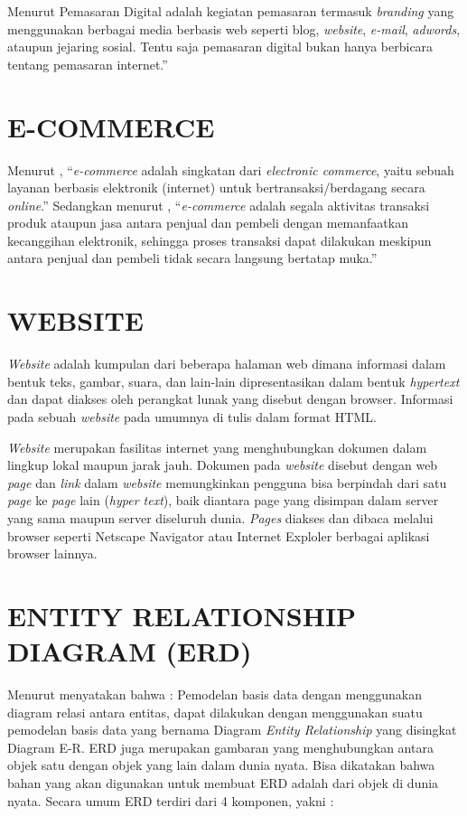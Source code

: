 \par Menurut \cite{tarigan2013creative} Pemasaran Digital adalah kegiatan pemasaran termasuk \textit{branding} yang menggunakan berbagai media berbasis web seperti blog, \textit{website}, \textit{e-mail}, \textit{adwords}, ataupun jejaring sosial. Tentu saja pemasaran digital bukan hanya berbicara tentang pemasaran internet.”

\section{\uppercase{E-commerce}}
Menurut \cite{yuhefizar2013} , “\textit{e-commerce} adalah singkatan dari \textit{electronic commerce}, yaitu sebuah layanan berbasis elektronik (internet) untuk bertransaksi/berdagang secara \textit{online}.” Sedangkan menurut \cite{saputra2013}, “\textit{e-commerce} adalah segala aktivitas transaksi produk ataupun jasa antara penjual dan pembeli dengan memanfaatkan kecanggihan elektronik, sehingga proses transaksi dapat dilakukan meskipun antara penjual dan pembeli tidak secara langsung bertatap muka.”

\section{\uppercase{Website}}
\textit{Website} adalah kumpulan dari beberapa halaman web dimana informasi dalam bentuk teks, gambar, suara, dan lain-lain dipresentasikan dalam bentuk \textit{hypertext} dan dapat diakses oleh perangkat lunak yang disebut dengan browser. Informasi pada sebuah \textit{website} pada umumnya di tulis dalam format HTML.

\par \textit{Website} merupakan fasilitas internet yang menghubungkan dokumen dalam lingkup lokal maupun jarak jauh. Dokumen pada \textit{website} disebut dengan web \textit{page} dan \textit{link} dalam \textit{website} memungkinkan pengguna bisa berpindah dari satu \textit{page} ke \textit{page} lain (\textit{hyper text}), baik diantara page yang disimpan dalam server yang sama maupun server diseluruh dunia. \textit{Pages} diakses dan dibaca melalui browser seperti Netscape Navigator atau Internet Exploler berbagai aplikasi browser lainnya. \citep{hakim2004}

\section{\uppercase{Entity Relationship Diagram (ERD)}}
Menurut \cite{priyadi2014} menyatakan bahwa : Pemodelan basis data dengan menggunakan diagram relasi antara entitas, dapat dilakukan dengan menggunakan suatu pemodelan basis data yang bernama Diagram \textit{Entity Relationship} yang disingkat Diagram E-R. ERD juga merupakan gambaran yang menghubungkan antara objek satu dengan objek yang lain dalam dunia nyata. Bisa dikatakan bahwa bahan yang akan digunakan untuk membuat ERD adalah dari objek di dunia nyata. Secara umum ERD terdiri dari 4 komponen, yakni :

